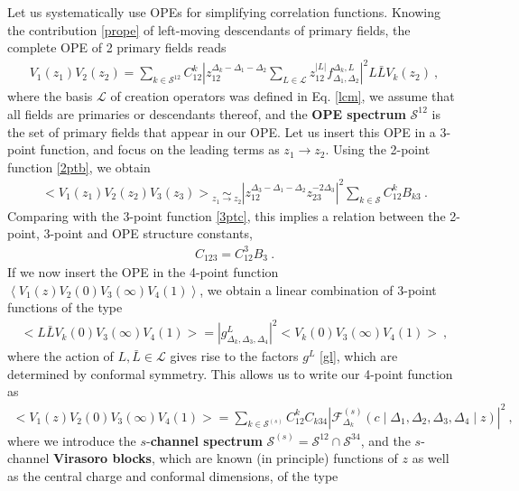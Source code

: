 \documentclass[12pt, a4paper]{article}
\newcommand{\myindex}[1]{\textbf{\boldmath #1}}
\theoremstyle{break}
\begin{document}
Let us systematically use OPEs for simplifying correlation functions. Knowing the contribution \eqref{prope} of left-moving descendants of primary fields, the complete OPE of 2 primary fields reads 
\begin{align}
 V_1(z_1)V_2(z_2) = \sum_{k\in\mathcal{S}^{12}} C_{12}^k \left|z_{12}^{\Delta_k-\Delta_1-\Delta_2}\sum_{L\in\mathcal{L}} z_{12}^{|L|}f_{\Delta_1,\Delta_2}^{\Delta_k,L}\right|^2 L\bar L V_k(z_2)\ ,
 \label{tope}
\end{align}
where the basis $\mathcal{L}$ of creation operators was defined in Eq. \eqref{lcm},
we assume that all fields are primaries or descendants thereof, and the \myindex{OPE spectrum} $\mathcal{S}^{12}$ is the set of primary fields that appear in our OPE. Let us insert this OPE in a 3-point function, and focus on the leading terms as $z_1\to z_2$. Using the 2-point function \eqref{2ptb}, we obtain
\begin{align}
  \Big< V_1(z_1)V_2(z_2)V_3(z_3) \Big> \underset{z_1\to z_2}{\sim} 
  \left|z_{12}^{\Delta_3-\Delta_1-\Delta_2}z_{23}^{-2\Delta_3}\right|^2 
  \sum_{k\in\mathcal{S}}
  C_{12}^k B_{k3}\ .
\end{align}
Comparing with the 3-point function \eqref{3ptc}, this implies a relation between the 2-point, 3-point and OPE structure constants,
\begin{align}
 \boxed{C_{123} = C_{12}^3B_{3}} \ .
 \label{ccb}
\end{align}
If we now insert the OPE in the 4-point function $\left<V_1(z)V_2(0)V_3(\infty)V_4(1)\right>$, we obtain a linear combination of 3-point functions of the type 
\begin{align}
 \Big<L\bar{L}V_k(0) V_3(\infty)V_4(1)\Big> = \left|g^L_{\Delta_k,\Delta_3,\Delta_4}\right|^2 \Big<V_k(0) V_3(\infty)V_4(1)\Big>\ ,
\end{align}
where the action of $L,\bar L\in\mathcal{L}$ gives rise to the factors $g^L$ \eqref{gl}, which are determined by conformal symmetry. 
This allows us to write our 4-point function as 
\begin{align}
 \boxed{\Big<V_1(z)V_2(0)V_3(\infty)V_4(1)\Big> = \sum_{k\in\mathcal{S}^{(s)}} C_{12}^k C_{k34} \left|\mathcal{F}^{(s)}_{\Delta_k}\left(c\middle|\Delta_1,\Delta_2,\Delta_3,\Delta_4\middle|z\right)\right|^2}  \ ,
 \label{sdec}
\end{align}
where we introduce the $s$-\myindex{channel spectrum} $\mathcal{S}^{(s)}= \mathcal{S}^{12}\cap \mathcal{S}^{34}$, and the $s$-channel \myindex{Virasoro blocks}, which are known (in principle) functions of $z$ as well as the central charge and conformal dimensions, of the type
\end{document}
